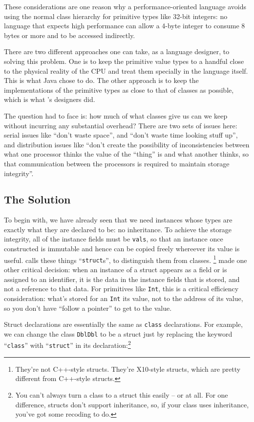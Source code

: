 These considerations are one reason why a performance-oriented language avoids
using the normal class hierarchy for primitive types like 32-bit integers: no language
that expects high performance can allow a 4-byte integer to consume 8 bytes or
more and to be accessed indirectly.  

There are two different approaches one can
take, as a language designer, to solving this problem.  One is to keep the
primitive value types to a handful close to the physical reality of the CPU
and treat them specially in the language itself.  This is what Java chose to do.
The other approach is to keep the implementations of the primitive
types as close to that of classes as possible, which is what \Xten's designers
did.

The question \Xten{} had to face is: how much of what classes give
us can we keep without incurring any substantial overhead? 
There are two sets of  issues here: serial issues like ``don't waste space'',
and ``don't waste time looking stuff up'', and distribution issues like ``don't
create the possibility of inconsistencies between what one processor thinks the
value of the ``thing'' is and what another thinks, so that communication
between the processors is required to maintain storage integrity''.

\subsection{The Solution}\label{sec:ecs}
To begin with, we have already seen that we need instances whose types are
exactly what they are declared to be: no inheritance.  To achieve the storage
integrity, all of the instance fields must be {\tt vals}, so that an
instance once constructed is immutable and hence can be copied freely
whereever its value is useful.  
\Xten{} calls these things ``{\tt struct}s'', to distinguish them from
classes.
\footnote{
They're not C++-style structs.  They're X10-style structs, which are pretty
different from C++-style structs.
}  
\Xten{} made one other critical decision: when an instance of a
struct appears as a field or is assigned to an identifier, it is the
data in the instance fields that is stored, and not a reference to that data.
For primitives like {\tt Int}, this is a critical efficiency consideration:
what's stored for an {\tt Int} its value, not to the address of its value, so
you don't have ``follow a pointer'' to get to the value.

Struct declarations are essentially the same as {\tt class} declarations.
For example, we can
change the class {\tt DblDbl} to be a struct just by replacing the keyword
``{\tt class}'' with ``{\tt struct}'' in its declaration:\footnote{You can't
always turn a class to a struct this easily -- or at all.  
For one difference, 
structs don't support inheritance, so, 
if your class uses
inheritance, you've got some recoding to do.}

